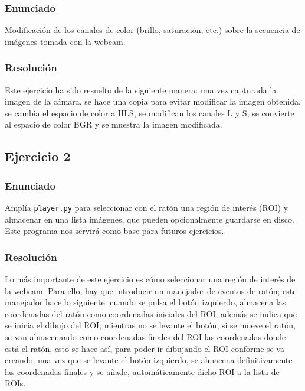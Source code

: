 \documentclass[a4paper,10pt,titlepage,oneside,openright]{book}
\begin{document}
\subsubsection*{Enunciado}
Modificación de los canales de color (brillo, saturación, etc.) sobre la secuencia de imágenes tomada con la webcam.

\subsubsection*{Resolución}
Este ejercicio ha sido resuelto de la siguiente manera: una vez capturada la imagen de la cámara, se hace una copia para evitar modificar la imagen obtenida, se cambia el espacio de color a HLS, se modifican los canales L y S, se convierte al espacio de color BGR y se muestra la imagen modificada.


\medskip
\subsection{Ejercicio 2}

\subsubsection*{Enunciado}
Amplía \texttt{player.py} para seleccionar con el ratón una región de interés (ROI) y almacenar en una lista imágenes, que pueden opcionalmente guardarse en disco. Este programa nos servirá como base para futuros ejercicios.

\subsubsection*{Resolución}
Lo más importante de este ejercicio es cómo seleccionar una región de interés de la webcam. Para ello, hay que introducir un manejador de eventos de ratón; este manejador hace lo siguiente: cuando se pulsa el botón izquierdo, almacena las coordenadas del ratón como coordenadas iniciales del ROI, además se indica que se inicia el dibujo del ROI; mientras no se levante el botón, si se mueve el ratón, se van almacenando como coordenadas finales del ROI las coordenadas donde está el ratón, esto se hace así, para poder ir dibujando el ROI conforme se va creando; una vez que se levante el botón izquierdo, se almacena definitivamente las coordenadas finales y se añade, automáticamente dicho ROI a la lista de ROIs. \\
\end{document}
